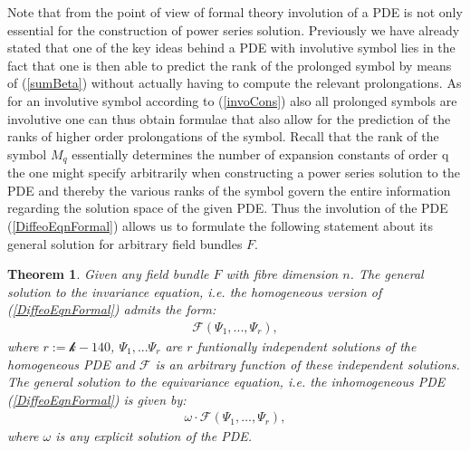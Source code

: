 \documentclass[a4paper,12pt, DIV=14, BCOR=5mm, twoside, headsepline]{scrbook}
\newtheorem{theorem}{Theorem}[section]
\begin{document}
Note that from the point of view of formal theory involution of a PDE is not only essential for the construction of power series solution. Previously we have already stated that one of the key ideas behind a PDE with involutive symbol lies in the fact that one is then able to predict the rank of the prolonged symbol by means of (\ref{sumBeta}) without actually having to compute the relevant prolongations. As for an involutive symbol according to (\ref{invoCons}) also all prolonged symbols are involutive one can thus obtain formulae that also allow for the prediction of the ranks of higher order prolongations of the symbol. Recall that the rank of the symbol $M_q$ essentially determines the number of expansion constants of order q the one might specify arbitrarily when constructing a power series solution to the PDE  and thereby the various ranks of the symbol govern the entire information regarding the solution space of the given PDE.
Thus the involution of the PDE (\ref{DiffeoEqnFormal}) allows us to formulate the following statement about its general solution for arbitrary field bundles $F$.
\begin{theorem}\label{GeneralSol}
Given any field bundle $F$ with fibre dimension $n$. The general solution to the invariance equation, i.e. the homogeneous version of (\ref{DiffeoEqnFormal}) admits the form:
\begin{align}
    \mathcal{F} \left (\Psi_1,...,\Psi_r \right ),
\end{align}
where $r:=\mathcal{k}-140$, $\Psi_1,...\Psi_r$ are $r$ funtionally independent solutions of the homogeneous PDE and $\mathcal{F}$ is an arbitrary function of these independent solutions. The general solution to the equivariance equation, i.e. the inhomogeneous PDE (\ref{DiffeoEqnFormal}) is given by:
\begin{align}
    \omega \cdot \mathcal{F} \left (\Psi_1,...,\Psi_r \right ),
\end{align}
where $\omega$ is any explicit solution of the PDE. 
\end{theorem}
\end{document}
